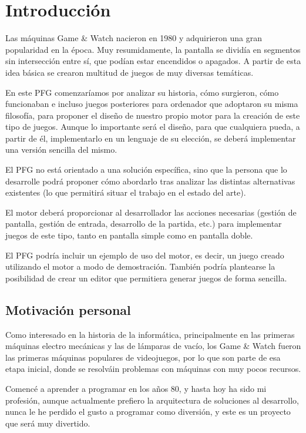 \documentclass[../main.tex]{subfiles}
\begin{document}
\chapter{Introducción}
\label{C:introduccion}

Las máquinas Game \& Watch nacieron en 1980 y adquirieron una gran popularidad en la época. Muy resumidamente, la pantalla se dividía en segmentos sin intersección entre sí, que podían estar encendidos o apagados. A partir de esta idea básica se crearon multitud de juegos de muy diversas temáticas.

En este PFG comenzaríamos por analizar su historia, cómo surgieron, cómo funcionaban e incluso juegos posteriores para ordenador que adoptaron su misma filosofía, para proponer el diseño de nuestro propio motor para la creación de este tipo de juegos. Aunque lo importante será el diseño, para que cualquiera pueda, a partir de él, implementarlo en un lenguaje de su elección, se deberá implementar una versión sencilla del mismo.

El PFG no está orientado a una solución específica, sino que la persona que lo desarrolle podrá proponer cómo abordarlo tras analizar las distintas alternativas existentes (lo que permitirá situar el trabajo en el estado del arte).

El motor deberá proporcionar al desarrollador las acciones necesarias (gestión de pantalla, gestión de entrada, desarrollo de la partida, etc.) para implementar juegos de este tipo, tanto en pantalla simple como en pantalla doble.

El PFG podría incluir un ejemplo de uso del motor, es decir, un juego creado utilizando el motor a modo de demostración. También podría plantearse la posibilidad de crear un editor que permitiera generar juegos de forma sencilla.

\section{Motivación personal}

Como interesado en la historia de la informática, principalmente en las primeras máquinas electro mecánicas y las de lámparas de vacío, los Game \& Watch fueron las primeras máquinas populares de videojuegos, por lo que son parte de esa etapa inicial, donde se resolváin problemas con máquinas con muy pocos recursos.

Comencé a aprender a programar en los años 80, y hasta hoy ha sido mi profesión, aunque actualmente prefiero la arquitectura de soluciones al desarrollo, nunca le he perdido el gusto a programar como diversión, y este es un proyecto que será muy divertido.
\end{document}
